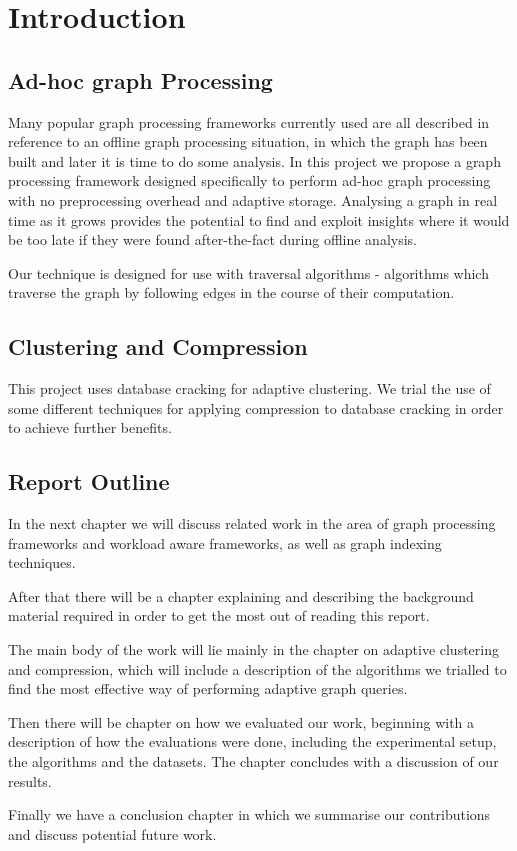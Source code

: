 \chapter{Introduction}

\section{Ad-hoc graph Processing}

Many popular graph processing frameworks currently used are all described in reference to an
offline graph processing situation, in which the graph has been built and later it is time to do some
analysis. In this project we propose a graph processing framework designed specifically to perform
ad-hoc graph processing with no preprocessing overhead and adaptive storage. Analysing a graph in real
time as it grows provides the potential to find and exploit insights where it would be too late if
they were found after-the-fact during offline analysis.

Our technique is designed for use with traversal algorithms - algorithms which traverse the graph
by following edges in the course of their computation.

\section{Clustering and Compression}

This project uses database cracking for adaptive clustering. We trial the use of some different
techniques for applying compression to database cracking in order to achieve further benefits.

\section{Report Outline}

In the next chapter we will discuss related work in the area of graph processing frameworks and
workload aware frameworks, as well as graph indexing techniques.

After that there will be a chapter explaining and describing the background material required in order
to get the most out of reading this report.

The main body of the work will lie mainly in the chapter on adaptive clustering and compression, which
will include a description of the algorithms we trialled to find the most effective way of performing
adaptive graph queries.

Then there will be chapter on how we evaluated our work, beginning with a description of how the
evaluations were done, including the experimental setup, the algorithms and the datasets. The chapter
concludes with a discussion of our results.

Finally we have a conclusion chapter in which we summarise our contributions and discuss potential future work.
